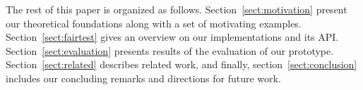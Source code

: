 The rest of this paper is organized as follows. Section~\ref{sect:motivation}
present our theoretical foundations along with a set of motivating examples.
Section~\ref{sect:fairtest} gives an overview on our \sysname implementations
and its API. Section~\ref{sect:evaluation} presents results of the evaluation
of our \sysname prototype. Section~\ref{sect:related} describes related work,
and finally, section~\ref{sect:conclusion} includes our concluding remarks and
directions for future work.
